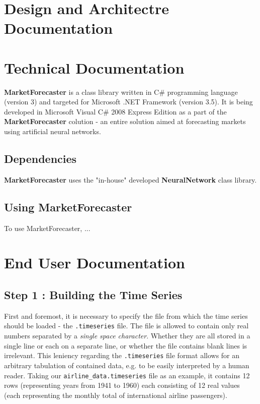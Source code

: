 \section{Design and Architectre Documentation}

\section{Technical Documentation}

\textbf{MarketForecaster} is a class library written in C\# programming language (version 3) and targeted for Microsoft .NET Framework (version 3.5). It is being developed in Microsoft Visual C\# 2008 Express Edition as a part of the \textbf{MarketForecaster} colution - an entire solution aimed at forecasting markets using artificial neural networks.

\subsection{Dependencies}

\textbf{MarketForecaster} uses the "in-house" developed \textbf{NeuralNetwork} class library.

\subsection{Using \textbf{MarketForecaster}}

To use MarketForecaster, ...

\section{End User Documentation}

\subsection{Step 1 : Building the Time Series}

First and foremost, it is necessary to specify the file from which the time series should be loaded - the \texttt{.timeseries} file. The file is allowed to contain only real numbers separated by a \textit{single space character}. Whether they are all stored in a single line or each on a separate line, or whether the file contains blank lines is irrelevant. This leniency regarding the \texttt{.timeseries} file format allows for an arbitrary tabulation of contained data, e.g. to be easily interpreted by a human reader.
Taking our \texttt{airline\_data.timeseries} file as an example, it contains 12 rows (representing years from 1941 to 1960) each consisting of 12 real values (each representing the monthly total of international airline passengers).

